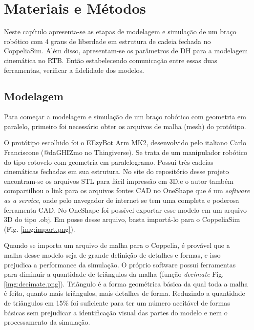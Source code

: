 \chapter{Materiais e Métodos} \label{ch:MM} %
Neste capítulo apresenta-se as etapas de modelagem e simulação de um braço robótico com 4 graus de
liberdade em estrutura de cadeia fechada no CoppeliaSim. Além disso, apresentam-se os parâmetros de DH para a modelagem cinemática no RTB. Então estabelecendo comunicação entre essas duas ferramentas, verificar a fidelidade dos modelos.

\section{Modelagem}

Para começar a modelagem e simulação de um braço robótico com geometria em paralelo, primeiro foi necessário obter os arquivos de malha (mesh) do protótipo.

O protótipo escolhido foi o EEzyBot Arm MK2, desenvolvido pelo italiano Carlo Franciscone (@daGHIZmo no Thingiverse). Se trata de um manipulador robótico do tipo cotovelo com geometria em paralelogramo. Possui três cadeias cinemáticas fechadas em sua estrutura. No site do repositório desse projeto encontram-se os arquivos STL para fácil impressão em 3D,e o autor também compartilhou o link para os arquivos fontes CAD no OneShape que é um \textit{software as a service}, onde pelo navegador de internet se tem uma completa e poderosa ferramenta CAD. No OneShape foi possível exportar esse modelo em um arquivo 3D do tipo .obj. Em posse desse arquivo, basta importá-lo para o CoppeliaSim (Fig. \ref{img:import.png}).


Quando se importa um arquivo de malha para o Coppelia, é provável que a malha desse modelo seja de grande definição de detalhes e formas, e isso prejudica a performance da simulação. O próprio software possui ferramentas para diminuir a quantidade de triângulos da malha (função \textit{decimate} Fig. \ref{img:decimate.png}). Triângulo é a forma geométrica básica da qual toda a malha é feita, quanto mais triângulos, mais detalhes de forma. Reduzindo a quantidade de triângulos em 15\% foi suficiente para ter um número aceitável de formas básicas sem prejudicar a identificação visual das partes do modelo e nem o processamento da simulação.

